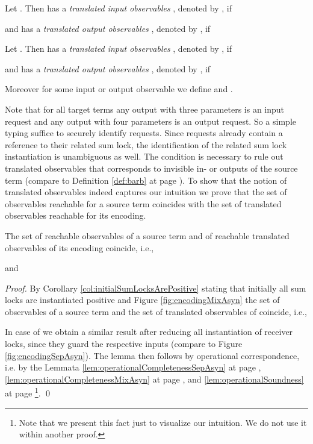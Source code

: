 \documentclass[]{llncs}
\begin{document}
\begin{definition} \label{def:transBarb}
	Let . Then  has a \emph{translated input observables} , denoted by , if
	
	and  has a \emph{translated output observables} , denoted by , if
	
	Let . Then  has a \emph{translated input observables} , denoted by , if
	
	and  has a \emph{translated output observables} , denoted by , if
	
	Moreover for some input or output observable  we define  and .
\end{definition}

Note that for all target terms  any output with three parameters is an input request and any output with four parameters is an output request. So a simple typing suffice to securely identify requests. Since requests already contain a reference to their related sum lock, the identification of the related sum lock instantiation is unambiguous as well. The condition  is necessary to rule out translated observables that corresponds to invisible in- or outputs of the source term (compare to Definition \ref{def:barb} at page \pageref{def:barb}). To show that the notion of translated observables indeed captures our intuition we prove that the set of observables reachable for a source term coincides with the set of translated observables reachable for its encoding.

\begin{lemma}
	The set of reachable observables of a source term and of reachable translated observables of its encoding coincide, i.e.,
	
	and
	
\end{lemma}

\begin{proof}
	By Corollary \ref{col:initialSumLocksArePositive} stating that initially all sum locks are instantiated positive and Figure \ref{fig:encodingMixAsyn} the set of observables of a source term  and the set of translated observables of  coincide, i.e.,
	
	In case of  we obtain a similar result after reducing all instantiation of receiver locks, since they guard the respective inputs (compare to Figure \ref{fig:encodingSepAsyn}). The lemma then follows by operational correspondence, i.e. by the Lemmata \ref{lem:operationalCompletenessSepAsyn} at page \pageref{lem:operationalCompletenessSepAsyn}, \ref{lem:operationalCompletenessMixAsyn} at page \pageref{lem:operationalCompletenessMixAsyn},  and \ref{lem:operationalSoundness} at page \pageref{lem:operationalSoundness}\footnote{Note that we present this fact just to visualize our intuition. We do not use it within another proof.}.
	\qed
\end{proof}
\end{document}
